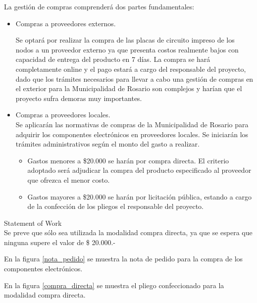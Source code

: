 \documentclass[11pt]{charter}
\begin{document}
La gestión de compras comprenderá dos partes fundamentales:
\begin{itemize}
\item Compras a proveedores externos.

Se optará por realizar la compra de las placas de circuito impreso de los nodos a un proveedor externo ya que presenta costos realmente bajos con capacidad de entrega del producto en 7 días. La compra se hará completamente online y el pago estará a cargo del responsable del proyecto, dado que los trámites necesarios para llevar a cabo una gestión de compras en el exterior para la Municipalidad de Rosario son complejos y harían que el proyecto sufra demoras muy importantes.
\item Compras a proveedores locales.\\
Se aplicarán las normativas de compras de la Municipalidad de Rosario para adquirir los componentes electrónicos en proveedores locales. Se iniciarán los trámites administrativos según el monto del gasto a realizar.
\begin{itemize}
\item Gastos menores a \$20.000 se harán por compra directa. El criterio adoptado será adjudicar la compra del producto especificado al proveedor que ofrezca el menor costo.
\item Gastos mayores a \$20.000 se harán por licitación pública, estando a cargo de la confección de los pliegos el responsable del proyecto. 
\end{itemize}
\end{itemize}

Statement of Work\\
Se preve que sólo sea utilizada la modalidad compra directa, ya que se espera que ninguna supere el valor de \$ 20.000.-

En la figura \ref{nota_pedido} se muestra la nota de pedido para la compra de los componentes electrónicos.

En la figura \ref{compra_directa} se muestra el pliego confeccionado para la modalidad compra directa.
\end{document}
